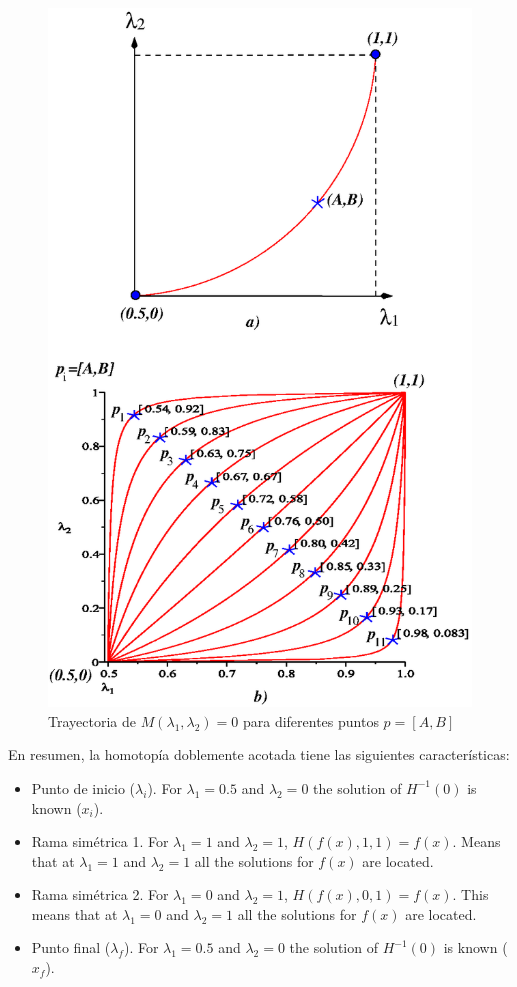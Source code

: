 \documentclass[conference,letterpaper,twocolumn]{IEEEtran}
\begin{document}
\begin{figure}[hbtp]
\centering
\includegraphics[scale=0.6]{fig/curvasl.eps}
\caption{Trayectoria  de $M(\lambda_1,\lambda_2)=0$ para diferentes puntos $p=[A,B]$}
\label{curvasl}
\end{figure}




En resumen, la homotopía doblemente acotada tiene las siguientes características:

\begin{itemize}
\item Punto de inicio ($\lambda_i$). For $\lambda_1=0.5$ and $\lambda_2=0$ the solution of $H^{-1}(0)$ is known ($x_i$). 
\item Rama simétrica 1. For $\lambda_1=1$ and $\lambda_2=1$, ${H}({f}({x}),1,1)={f}({x})$. Means that at $\lambda_1=1$ and $\lambda_2=1$ all the solutions for ${f}({x})$ are located.
\item Rama simétrica 2. For $\lambda_1=0$ and $\lambda_2=1$, ${H}({f}({x}),0,1 )={f}({x})$. This means that at $\lambda_1=0$ and $\lambda_2=1$ all the solutions for ${f}({x})$ are located.
\item Punto final ($\lambda_f$). For $\lambda_1=0.5$ and $\lambda_2=0$ the solution of $H^{-1}(0)$ is known ($x_f$). 
\end{itemize}
\end{document}
